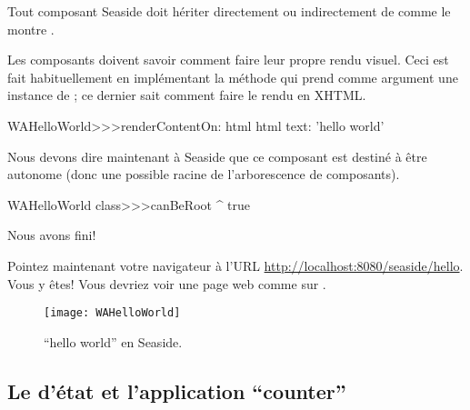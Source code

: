 \documentclass[a4paper,10pt,twoside]{book}
\begin{document}
Tout composant Seaside doit hériter directement ou indirectement de
 comme le montre .


Les composants doivent savoir comment faire leur propre rendu
  visuel.
Ceci est fait habituellement en implémentant la méthode
 qui prend comme argument une
instance de  ; ce dernier sait comment faire le
rendu en XHTML.

\begin{code}{}
WAHelloWorld>>>renderContentOn: html
	html text: 'hello world'
\end{code}

\noindent
Nous devons dire maintenant à Seaside que ce composant est destiné à
être autonome
(donc une possible racine de l'arborescence de composants). %


\begin{code}{}
WAHelloWorld class>>>canBeRoot
	^ true
\end{code}

\noindent
Nous avons fini!

Pointez maintenant votre navigateur 
à l'URL \url{http://localhost:8080/seaside/hello}.
Vous y êtes! Vous devriez voir une page web comme sur
 .

\begin{figure}[htb]
\begin{center}
\texttt{[image: WAHelloWorld]}
\caption{``hello world'' en Seaside.}
\end{center}
\end{figure}

\subsection{Le \backtracking d'état et l'application ``counter''}
\end{document}
